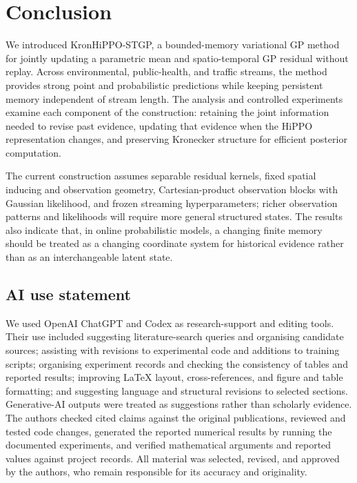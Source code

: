 \documentclass[twoside]{article}
\newcommand{\method}{KronHiPPO-STGP\xspace}
\begin{document}
\FloatBarrier
\setcounter{dbltopnumber}{2}

\section{Conclusion}

We introduced \method, a bounded-memory variational GP method for jointly updating a parametric mean and spatio-temporal GP residual without replay. Across environmental, public-health, and traffic streams, the method provides strong point and probabilistic predictions while keeping persistent memory independent of stream length. The analysis and controlled experiments examine each component of the construction: retaining the joint information needed to revise past evidence, updating that evidence when the HiPPO representation changes, and preserving Kronecker structure for efficient posterior computation.

The current construction assumes separable residual kernels, fixed spatial
inducing and observation geometry, Cartesian-product observation blocks with
Gaussian likelihood, and frozen streaming hyperparameters;
richer observation patterns and likelihoods will require more general structured
states. The results also indicate that, in online probabilistic models, a changing
finite memory should be treated as a changing coordinate system for historical
evidence rather than as an interchangeable latent state.

\subsection*{AI use statement}

We used OpenAI ChatGPT and Codex as research-support and editing tools. Their use included suggesting literature-search queries and organising candidate sources; assisting with revisions to experimental code and additions to training scripts; organising experiment records and checking the consistency of tables and reported results; improving LaTeX layout, cross-references, and figure and table formatting; and suggesting language and structural revisions to selected sections. Generative-AI outputs were treated as suggestions rather than scholarly evidence. The authors checked cited claims against the original publications, reviewed and tested code changes, generated the reported numerical results by running the documented experiments, and verified mathematical arguments and reported values against project records. All material was selected, revised, and approved by the authors, who remain responsible for its accuracy and originality.
\end{document}
